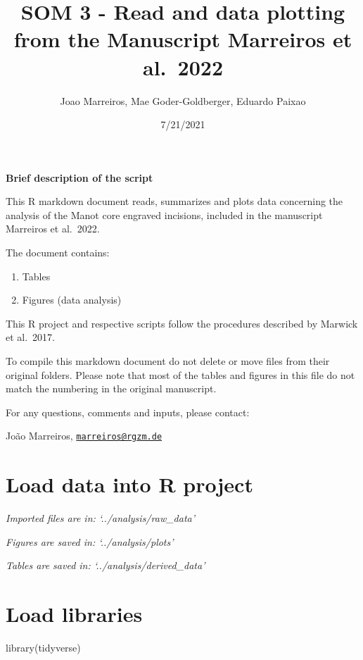 \documentclass[
]{article}
\title{SOM 3 - Read and data plotting from the Manuscript Marreiros et
al.~2022}
\author{Joao Marreiros, Mae Goder-Goldberger, Eduardo Paixao}
\date{7/21/2021}
\newenvironment{Shaded}{\begin{snugshade}}{\end{snugshade}}
\newcommand{\FunctionTok}[1]{\textcolor[rgb]{0.00,0.00,0.00}{#1}}
\newcommand{\NormalTok}[1]{#1}
\providecommand{\tightlist}{%
  \setlength{\itemsep}{0pt}\setlength{\parskip}{0pt}}
\begin{document}
\maketitle

\textbf{Brief description of the script}

This R markdown document reads, summarizes and plots data concerning the
analysis of the Manot core engraved incisions, included in the
manuscript Marreiros et al.~2022.

The document contains:

\begin{enumerate}
\def\labelenumi{\arabic{enumi}.}
\tightlist
\item
  Tables
\item
  Figures (data analysis)
\end{enumerate}

This R project and respective scripts follow the procedures described by
Marwick et al.~2017.

To compile this markdown document do not delete or move files from their
original folders. Please note that most of the tables and figures in
this file do not match the numbering in the original manuscript.

For any questions, comments and inputs, please contact:

João Marreiros,
\href{mailto:marreiros@rgzm.de}{\nolinkurl{marreiros@rgzm.de}}

\hypertarget{load-data-into-r-project}{%
\section{Load data into R project}\label{load-data-into-r-project}}

\emph{Imported files are in: `../analysis/raw\_data'}

\emph{Figures are saved in: `../analysis/plots'}

\emph{Tables are saved in: `../analysis/derived\_data'}

\hypertarget{load-libraries}{%
\section{Load libraries}\label{load-libraries}}

\begin{Shaded}
\begin{Highlighting}[]
\FunctionTok{library}\NormalTok{(tidyverse)}
\end{Highlighting}
\end{Shaded}
\end{document}
